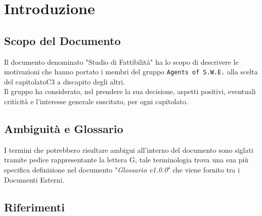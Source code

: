 \section{Introduzione}\label{intro}

\subsection{Scopo del Documento}
Il documento denominato "Studio di Fattibilità" ha lo scopo di descrivere le motivazioni che hanno portato i membri del gruppo \texttt{Agents of S.W.E.} alla scelta del capitolato\glossario C3 a discapito degli altri.\\
Il gruppo ha considerato, nel prendere la sua decisione, aspetti positivi, eventuali criticità e l'interesse generale suscitato, per ogni capitolato.

\subsection{Ambiguità e Glossario}
I termini che potrebbero risultare ambigui all'interno del documento sono siglati tramite pedice rappresentante la lettera \textmd{G}, tale terminologia trova una sua più specifica definizione nel documento "\textit{Glossario v1.0.0}" che viene fornito tra i Documenti Esterni.

\subsection{Riferimenti}
